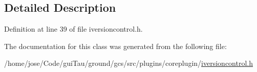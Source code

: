 \subsection{Detailed Description}


Definition at line 39 of file iversioncontrol.\-h.



The documentation for this class was generated from the following file\-:\begin{DoxyCompactItemize}
\item 
/home/jose/\-Code/gui\-Tau/ground/gcs/src/plugins/coreplugin/\hyperlink{iversioncontrol_8h}{iversioncontrol.\-h}\end{DoxyCompactItemize}
